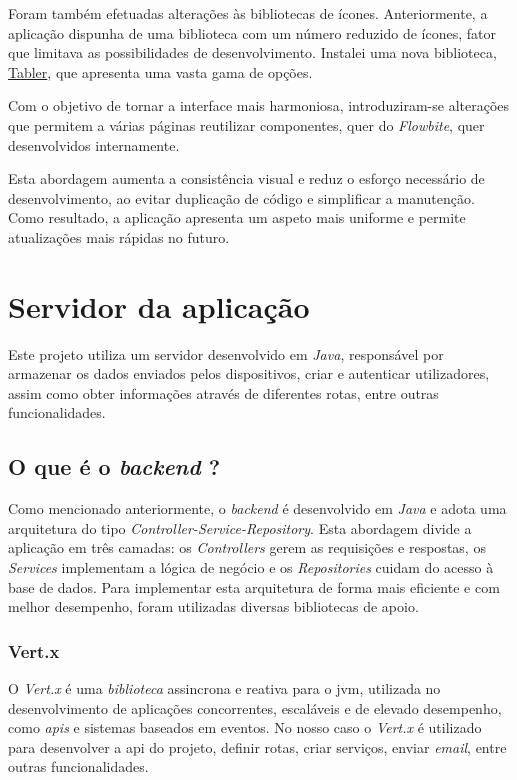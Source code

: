 Foram também efetuadas alterações às bibliotecas de ícones. Anteriormente, a aplicação dispunha de uma biblioteca com um número reduzido de ícones, fator que limitava as possibilidades de desenvolvimento. Instalei uma nova biblioteca, \href{https://tabler.io/icons}{Tabler}, que apresenta uma vasta gama de opções.

Com o objetivo de tornar a interface mais harmoniosa, introduziram-se alterações que permitem a várias páginas reutilizar componentes, quer do \textit{Flowbite}, quer desenvolvidos internamente.

Esta abordagem aumenta a consistência visual e reduz o esforço necessário de desenvolvimento, ao evitar duplicação de código e simplificar a manutenção. Como resultado, a aplicação apresenta um aspeto mais uniforme e permite atualizações mais rápidas no futuro.

\clearpage
\section{Servidor da aplicação}
Este projeto utiliza um servidor desenvolvido em \textit{Java}, responsável por armazenar os dados enviados pelos dispositivos, criar e autenticar utilizadores, assim como obter informações através de diferentes rotas, entre outras funcionalidades.

\subsection{O que é o \textit{backend} ?}
Como mencionado anteriormente, o \textit{backend} é desenvolvido em \textit{Java} e adota uma arquitetura do tipo \textit{Controller-Service-Repository}. Esta abordagem divide a aplicação em três camadas: os \textit{Controllers} gerem as requisições e respostas, os \textit{Services} implementam a lógica de negócio e os \textit{Repositories} cuidam do acesso à base de dados. Para implementar esta arquitetura de forma mais eficiente e com melhor desempenho, foram utilizadas diversas bibliotecas de apoio.

\subsubsection{\textbf{Vert.x}}
O \textit{Vert.x} é uma \textit{biblioteca} assincrona e reativa para o \acs{jvm}, utilizada no desenvolvimento de aplicações concorrentes, escaláveis e de elevado desempenho, como \textit{\acs{api}s} e sistemas baseados em eventos. No nosso caso o \textit{Vert.x} é utilizado para desenvolver a \acs{api} do projeto, definir rotas, criar serviços, enviar \textit{email}, entre outras funcionalidades.

